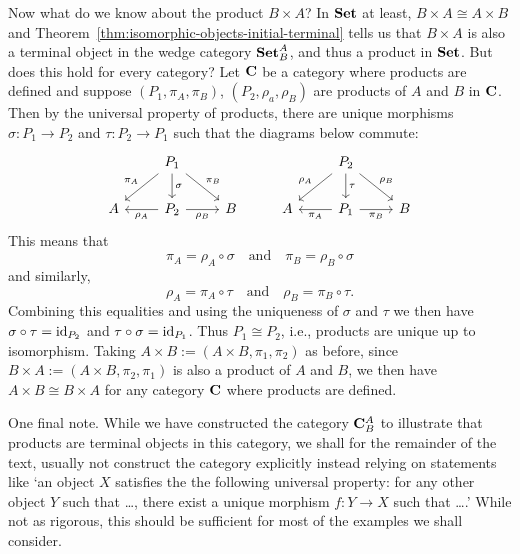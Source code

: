 \begin{example}
    Now what do we know about the product \(B \times A\)? In \(\mathbf{Set}\) at least,
    \(B \times A \cong A \times B\) and
    Theorem~\ref{thm:isomorphic-objects-initial-terminal} tells us that \(B
    \times A\) is also a terminal object in the wedge category \(\mathbf{Set}^A_B\), and
    thus a product in \(\mathbf{Set}\). But does this hold for every category? Let
    \(\mathbf{C}\) be a category where products are defined and suppose \((P_1,
    \pi_A, \pi_B)\), \((P_2, \rho_a, \rho_B)\) are products of \(A\) and \(B\)
    in \(\mathbf{C}\). Then by the universal property of products, there are
    unique morphisms \(\sigma : P_1 \to P_2\) and \(\tau : P_2 \to P_1\) such
    that the diagrams below commute:
    \[
        \begin{tikzcd}
            & P_1 \arrow[ld, "\pi_A"'] \arrow[rd, "\pi_B"] \arrow[d, "\sigma"] &   &   & P_2 \arrow[ld, "\rho_A"'] \arrow[rd, "\rho_B"] \arrow[d, "\tau"] &   \\
          A & P_2 \arrow[l, "\rho_A"] \arrow[r, "\rho_B"']                     & B & A & P_1 \arrow[l, "\pi_A"] \arrow[r, "\pi_B"']                       & B
          \end{tikzcd}
    \]
    This means that
    \[
          \pi_A = \rho_A \circ \sigma \quad \text{and} \quad \pi_B = \rho_B \circ \sigma
    \]
    and similarly,
    \[
          \rho_A = \pi_A \circ \tau \quad \text{and} \quad \rho_B = \pi_B \circ \tau.
    \]
    Combining this equalities and using the uniqueness of \(\sigma\) and
    \(\tau\) we then have \(\sigma \circ \tau = \operatorname{id}_{P_2}\) and \(\tau \circ
    \sigma = \operatorname{id}_{P_1}\). Thus \(P_1 \cong P_2\), i.e., products are unique up
    to isomorphism. Taking \(A \times B := (A \times B, \pi_1, \pi_2)\) as
    before, since \(B \times A := (A \times B, \pi_2, \pi_1)\) is also a product
    of \(A\) and \(B\), we then have \(A \times B \cong B \times A\) for any
    category \(\mathbf{C}\) where products are defined.

    One final note. While we have constructed the category \(\mathbf{C}^A_B\) to
    illustrate that products are terminal objects in this category, we shall for
    the remainder of the text, usually not construct the category explicitly
    instead relying on statements like `an object \(X\) satisfies the the
    following universal property: for any other object \(Y\) such that \dots,
    there exist a unique morphism \(f: Y \to X\) such that \dots.' While not as
    rigorous, this should be sufficient for most of the examples we shall
    consider.
\end{example}

